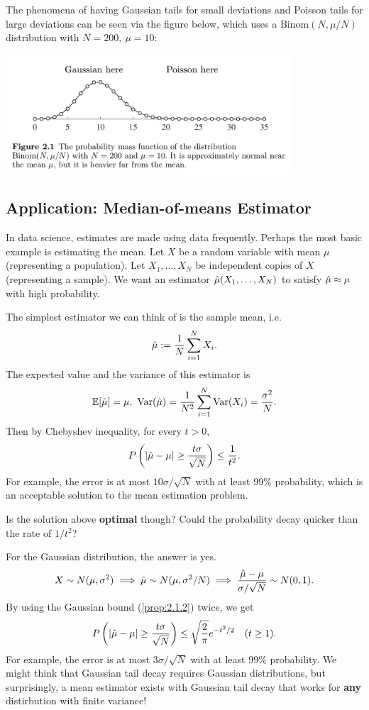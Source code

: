 \begin{remark}
\label{rmk:2.3.5}
The phenomena of having Gaussian tails for small deviations and Poisson tails for large deviations 
can be seen via the figure below, which uses a $\text{Binom}(N, \mu / N)$ distribution with 
$N = 200, \ \mu = 10$:
\begin{center}
	\includegraphics[width=0.8\textwidth]{Chapter 2/fig2-1.png}
\end{center}
\end{remark}



\subsection{Application: Median-of-means Estimator}
In data science, estimates are made using data frequently. Perhaps the most basic example is estimating 
the mean. Let $X$ be a random variable with mean $\mu$ (representing a population). Let $X_1, \dots, X_N$ 
be independent copies of $X$ (representing a sample). We want an estimator $\Hat{\mu}(X_1, \dots, X_N)$ 
to satisfy $\Hat{\mu} \approx \mu$ with high probability.

The simplest estimator we can think of is the sample mean, i.e. 
\[ \Hat{\mu} := \frac{1}{N} \sum_{i = 1}^{N} X_i. \]
The expected value and the variance of this estimator is 
\[ \mathbb{E}[\Hat{\mu}] = \mu, \ \mathrm{Var}(\Hat{\mu}) = \frac{1}{N^2}\sum_{i = 1}^{N} \mathrm{Var}(X_i) 
= \frac{\sigma^2}{N}. \]
Then by Chebyshev inequality, for every $t > 0$, 
\[ P \left( |\Hat{\mu} - \mu| \geq \frac{t \sigma}{\sqrt{N}} \right) \leq \frac{1}{t^2}. \]
For example, the error is at most $10 \sigma / \sqrt{N}$ with at least 99\% probability, which is an 
acceptable solution to the mean estimation problem.

Is the solution above \textbf{optimal} though? Could the probability decay quicker than the rate of $1 / t^2$?

For the Gaussian distribution, the answer is yes.
\[ X \sim N(\mu, \sigma^2) \implies \Hat{\mu} \sim N(\mu, \sigma^2 / N) 
\implies \frac{\Hat{\mu} - \mu}{\sigma / \sqrt{N}} \sim N(0, 1). \]
By using the Gaussian bound (\cref{prop:2.1.2}) twice, we get 
\[ P \left( |\Hat{\mu} - \mu| \geq \frac{t \sigma}{\sqrt{N}} \right) \leq 
\sqrt{\frac{2}{\pi}} e^{-t^2 / 2} \quad (t \geq 1). \]
For example, the error is at most $3 \sigma / \sqrt{N}$ with at least 99\% probability. We might think that 
Gaussian tail decay requires Gaussian distributions, but surprisingly, a mean estimator exists with Gaussian 
tail decay that works for \textbf{any} distirbution with finite variance!

